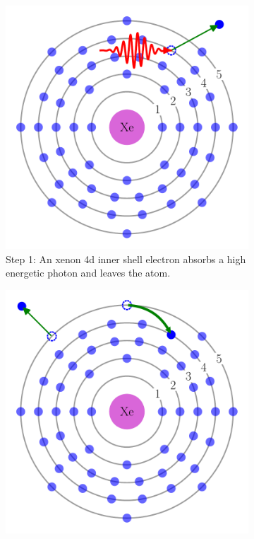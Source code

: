 \begin{figure}
 \centering
    \begin{subfigure}[t]{0.45\columnwidth}
        \centering
        \includegraphics[width=\textwidth]{figures/auger_step_1}
        \caption{Step 1: An xenon 4d inner shell electron absorbs a high
                 energetic photon and leaves the atom.}
        \label{fig:auger:1}
    \end{subfigure}
    \hspace{20pt}
    \begin{subfigure}[t]{0.45\columnwidth}
        \centering
        \includegraphics[width=\textwidth]{figures/auger_step_2}

\end{subfigure}
\end{figure}
